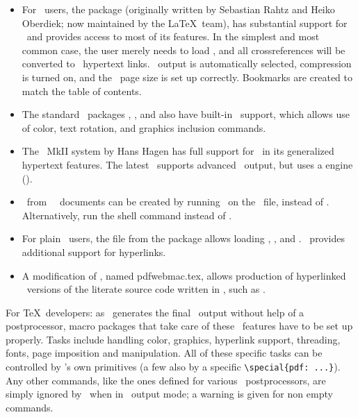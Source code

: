 \documentclass{pdftexmanual}
\begin{document}
\begin{itemize}
\item  For \LATEX\ users, the  package (originally
       written by Sebastian Rahtz and Heiko Oberdiek; now maintained by
       the \LaTeX\ team), has substantial support for \PDFTEX\ and
       provides access to most of its features. In the simplest and most
       common case, the user merely needs to load , and
       all cross\hyph references will be converted to \PDF\ hypertext
       links. \PDF\ output is automatically selected, compression is
       turned on, and the \PDF\ page size is set up correctly. Bookmarks
       are created to match the table of contents.

\item  The standard \LATEX\ packages , , and
        also have built-in \PDFTEX\ support, which allows
       use of color, text rotation, and graphics inclusion commands.

\item  The \CONTEXT\ MkII system by Hans Hagen has full support
       for \PDFTEX\ in its generalized hypertext features.
       The latest \CONTEXT\ supports advanced \PDF\ output, but
       uses a engine (\LMTX).

\item  \PDF\ from \GNU\ \TEXINFO\ documents can be created by running
       \PDFTEX\ on the \TEXINFO\ file, instead of \TEX. Alternatively,
       run the shell command  instead of .

\item  For plain \TEX\ users, the  file from the
        package allows loading ,
       , and . \EPLAIN\ provides additional
       support for hyperlinks.

\item  A modification of , named \filename
       {pdfwebmac.tex}, allows production of hyperlinked \PDF\ versions
       of the literate source code written in \WEB, such as \PDFTEX.

\end{itemize}

For \TeX\ developers: as \PDFTEX\ generates the final \PDF\ output
without help of a postprocessor, macro packages that take care of these
\PDF\ features have to be set up properly. Tasks include handling color,
graphics, hyperlink support, threading, fonts, page imposition and
manipulation. All of these \PDF\hyph specific tasks can be controlled by
\PDFTEX's own primitives (a few also by a \PDFTEX\hyph specific
\verb|\special{pdf: ...}|). Any other  commands, like the
ones defined for various \DVI\ postprocessors, are simply ignored by
\PDFTEX\ when in \PDF\ output mode; a warning is given for non\hyph
empty  commands.
\end{document}
